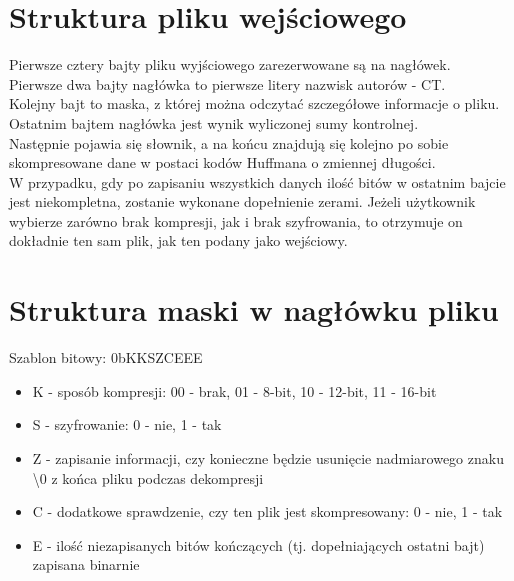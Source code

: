 \documentclass[]{article}
\begin{document}
\section{Struktura pliku wejściowego}\label{header-n279}
Pierwsze cztery bajty pliku wyjściowego zarezerwowane są na nagłówek. \\
Pierwsze dwa bajty nagłówka to pierwsze litery nazwisk autorów - CT.\\
Kolejny bajt to maska, z której można odczytać szczegółowe informacje o pliku. Ostatnim bajtem nagłówka jest wynik wyliczonej sumy kontrolnej.\\
Następnie pojawia się słownik, a na końcu znajdują się kolejno po sobie skompresowane dane w postaci kodów Huffmana o zmiennej długości.\\
W przypadku, gdy po zapisaniu wszystkich danych ilość bitów w ostatnim bajcie jest niekompletna, zostanie wykonane dopełnienie zerami. Jeżeli użytkownik wybierze zarówno brak kompresji, jak i brak szyfrowania, to otrzymuje on dokładnie ten sam plik, jak ten podany jako wejściowy.
\section{Struktura maski w nagłówku pliku}\label{header-n279}

    Szablon bitowy: 0bKKSZCEEE
\begin{itemize}
   \item K - sposób kompresji: 00 - brak, 01 - 8-bit, 10 - 12-bit, 11 - 16-bit
   \item  S - szyfrowanie: 0 - nie, 1 - tak
   \item  Z - zapisanie informacji, czy konieczne będzie usunięcie nadmiarowego znaku \textbackslash0 z końca pliku podczas dekompresji
   \item  C - dodatkowe sprawdzenie, czy ten plik jest skompresowany: 0 - nie, 1 - tak
   \item  E - ilość niezapisanych bitów kończących (tj. dopełniających ostatni bajt) zapisana binarnie
\end{itemize}
\end{document}
